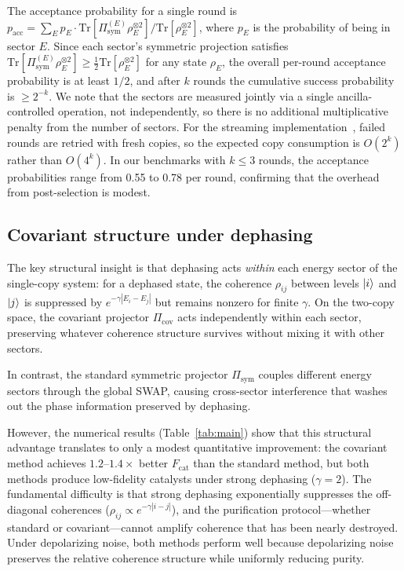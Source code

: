 \documentclass[prx,twocolumn,superscriptaddress,longbibliography,floatfix]{revtex4-2}
\begin{document}
The acceptance probability for a single round is $p_\mathrm{acc} = \sum_E p_E \cdot \mathrm{Tr}[\Pi_\mathrm{sym}^{(E)} \rho_E^{\otimes 2}]/\mathrm{Tr}[\rho_E^{\otimes 2}]$, where $p_E$ is the probability of being in sector $E$.
Since each sector's symmetric projection satisfies $\mathrm{Tr}[\Pi_\mathrm{sym}^{(E)} \rho_E^{\otimes 2}] \geq \frac{1}{2}\mathrm{Tr}[\rho_E^{\otimes 2}]$ for any state $\rho_E$, the overall per-round acceptance probability is at least $1/2$, and after $k$ rounds the cumulative success probability is $\geq 2^{-k}$.
We note that the sectors are measured jointly via a single ancilla-controlled operation, not independently, so there is no additional multiplicative penalty from the number of sectors.
For the streaming implementation~\cite{Childs2025}, failed rounds are retried with fresh copies, so the expected copy consumption is $O(2^k)$ rather than $O(4^k)$.
In our benchmarks with $k \leq 3$ rounds, the acceptance probabilities range from 0.55 to 0.78 per round, confirming that the overhead from post-selection is modest.

\subsection{Covariant structure under dephasing}
\label{sec:why_better}

The key structural insight is that dephasing acts \emph{within} each energy sector of the single-copy system: for a dephased state, the coherence $\rho_{ij}$ between levels $\ket{i}$ and $\ket{j}$ is suppressed by $e^{-\gamma|E_i - E_j|}$ but remains nonzero for finite $\gamma$.
On the two-copy space, the covariant projector $\Pi_\mathrm{cov}$ acts independently within each sector, preserving whatever coherence structure survives without mixing it with other sectors.

In contrast, the standard symmetric projector $\Pi_\mathrm{sym}$ couples different energy sectors through the global SWAP, causing cross-sector interference that washes out the phase information preserved by dephasing.

However, the numerical results (Table~\ref{tab:main}) show that this structural advantage translates to only a modest quantitative improvement: the covariant method achieves $1.2$--$1.4\times$ better $F_\mathrm{cat}$ than the standard method, but both methods produce low-fidelity catalysts under strong dephasing ($\gamma = 2$).
The fundamental difficulty is that strong dephasing exponentially suppresses the off-diagonal coherences ($\rho_{ij} \propto e^{-\gamma|i-j|}$), and the purification protocol---whether standard or covariant---cannot amplify coherence that has been nearly destroyed.
Under depolarizing noise, both methods perform well because depolarizing noise preserves the relative coherence structure while uniformly reducing purity.
\end{document}
